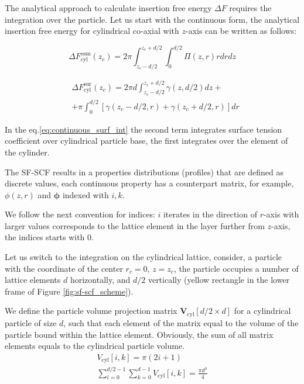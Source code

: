 \documentclass[10pt, a4paper]{article}
\begin{document}
\begin{multicols}{2}
The analytical approach to calculate insertion free energy $\Delta F$ requires the integration over the particle.
Let us start with the continuous form, the analytical insertion free energy for cylindrical co-axial with $z$-axis can be written as follows:

\begin{equation}
    \Delta F_{\textrm{cyl}}^{\textrm{osm}}(z_c) = 2 \pi \int_{z_c-d/2}^{z_c+d/2} \int_{0}^{d/2} \Pi(z, r) r dr dz
\end{equation}


\begin{equation}\label{eq:continuous_surf_int}
    \begin{aligned}
        &\Delta F_{\textrm{cyl}}^{\textrm{sur}}(z_c) = 2 \pi d \int_{z_c-d/2}^{z_c+d/2} \gamma(z,d/2) dz +
        \\
        &+ \pi \int_{0}^{d/2} \left[\gamma(z_c-d/2, r) + \gamma(z_c+d/2,r)\right] dr
    \end{aligned}
\end{equation}

In the eq.\ref{eq:continuous_surf_int} the second term integrates surface tension coefficient over cylindrical particle base, the first integrates over the element of the cylinder.

The SF-SCF results in a properties distributions (profiles) that are defined as discrete values, each continuous property has a counterpart matrix, for example, $\phi(z,r)$ and $\bm{\phi}$ indexed with $i,k$.

We follow the next convention for indices: $i$ iterates in the direction of $r$-axis with larger values corresponds to the lattice element in the layer further from $z$-axis, the indices starts with $0$.

Let us switch to the integration on the cylindrical lattice, consider, a particle with the coordinate of the center $r_c=0$, $z = z_{c}$, the particle occupies a number of lattice elements $d$ horizontally, and $d/2$ vertically (yellow rectangle in the lower frame of Figure \ref{fig:sf-scf_scheme}).

We define the particle volume projection matrix $\mathbf{V}_{\textrm{cyl}}[d/2 \times d]$ for a cylindrical particle of size $d$, such that each element of the matrix equal to the volume of the particle bound within the lattice element.
Obviously, the sum of all matrix elements equals to the cylindrical particle volume.
\begin{eqnarray}
    V_{\textrm{cyl}}[i, k] = \pi(2i + 1)
    \\
    \sum_{i=0}^{d/2-1} \sum_{k=0}^{d-1} V_{\textrm{cyl}}[i, k] = \frac{\pi d^3}{4}
\end{eqnarray}


\end{multicols}
\end{document}

